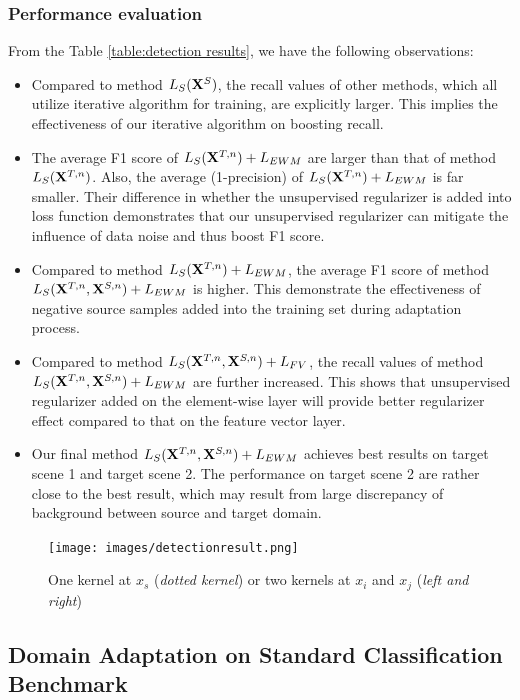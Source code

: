 \documentclass[runningheads]{llncs}
\begin{document}
\subsubsection{Performance evaluation}
From the Table \ref{table:detection results}, we have the following observations:
\begin{itemize}
    \item Compared to method $L_{S}({\bf X}^{S})$, the recall values of other methods, which all utilize iterative algorithm for training, are explicitly larger. This implies the effectiveness of our iterative algorithm on boosting recall.
    \item The average F1 score of $L_{S}({\bf X}^{T,n})+L_{EWM}$ are larger than that of method $L_{S}({\bf X}^{T,n})$. Also, the average (1-precision) of $L_{S}({\bf X}^{T,n})+L_{EWM}$ is far smaller. Their difference in whether the unsupervised regularizer is added into loss function demonstrates that our unsupervised regularizer can mitigate the influence of data noise and thus boost F1 score.
    \item Compared to method $L_{S}({\bf X}^{T,n})+L_{EWM}$, the average F1 score of method $L_{S}({\bf X}^{T,n},{\bf X}^{S,n})+L_{EWM}$ is higher. This demonstrate the effectiveness of negative source samples added into the training set during adaptation process.
    \item Compared to method $L_{S}({\bf X}^{T,n},{\bf X}^{S,n})+L_{FV}$, the recall values of method $L_{S}({\bf X}^{T,n},{\bf X}^{S,n})+L_{EWM}$ are further increased. This shows that unsupervised regularizer added on the element-wise layer will provide better regularizer effect compared to that on the feature vector layer.
    \item Our final method $L_{S}({\bf X}^{T,n},{\bf X}^{S,n})+L_{EWM}$ achieves best results on target scene 1 and target scene 2. The performance on target scene 2 are rather close to the best result, which may result from large discrepancy of background between source and target domain. 
\end{itemize}

\begin{figure}
\centering
\texttt{[image: images/detectionresult.png]}
\caption{One kernel at $x_s$ ({\it dotted kernel}) or two kernels at
$x_i$ and $x_j$ ({\it left and right}) }
\label{fig:detectionresult}
\end{figure}


\subsection{Domain Adaptation on Standard Classification Benchmark}
\end{document}
